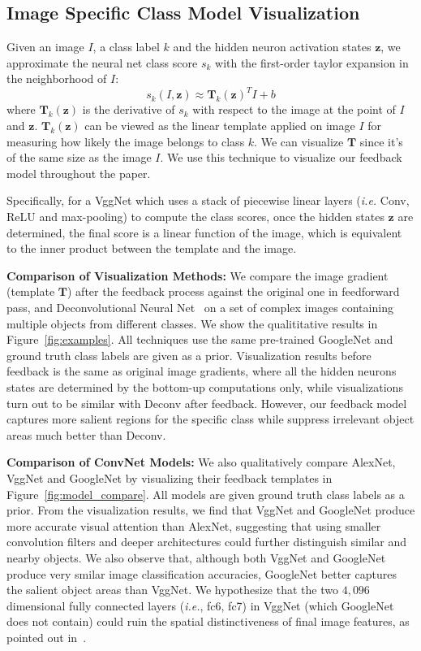 \subsection{Image Specific Class Model Visualization}
\label{subsec:visualization}
Given an image $I$, a class label $k$ and the hidden neuron activation states $\mathbf{z}$, we approximate the neural net class score $s_k$ with the first-order taylor expansion in the neighborhood of $I$:
\begin{equation}
  s_k(I, \mathbf{z}) \approx  \mathbf{T}_k(\mathbf{z})^T I + b
\end{equation}
where $\mathbf{T}_k(\mathbf{z})$ is the derivative of $s_k$ with respect to the image at the point of $I$ and $\mathbf{z}$. $\mathbf{T}_k(\mathbf{z})$ can be viewed as the linear template applied on image $I$ for measuring how likely the image belongs to class $k$. We can visualize $\mathbf{T}$ since it's of the same size as the image $I$. We use this technique to visualize our feedback model throughout the paper.

Specifically, for a VggNet which uses a stack of piecewise linear layers (\emph{i.e.} Conv, ReLU and max-pooling) to compute the class scores, once the hidden states $\mathbf{z}$ are determined, the final score is a linear function of the image, which is equivalent to the inner product between the template and the image.

\textbf{Comparison of Visualization Methods:} We compare the image gradient (template $\mathbf{T}$) after the feedback process against the original one in feedforward pass, and Deconvolutional Neural Net~\cite{zeiler2014visualizing} on a set of complex images containing multiple objects from different classes. We show the qualititative results in Figure~\ref{fig:examples}. All techniques use the same pre-trained GoogleNet and ground truth class labels are given as a prior. Visualization results before feedback is the same as original image gradients, where all the hidden neurons states are determined by the bottom-up computations only, while visualizations turn out to be similar with Deconv after feedback. However, our feedback model captures more salient regions for the specific class while suppress irrelevant object areas much better than Deconv.

\textbf{Comparison of ConvNet Models:} We also qualitatively compare AlexNet, VggNet and GoogleNet by visualizing their feedback templates in Figure~\ref{fig:model_compare}. All models are given ground truth class labels as a prior. From the visualization results, we find that VggNet and GoogleNet produce more accurate visual attention than AlexNet, suggesting that using smaller convolution filters and deeper architectures could further distinguish similar and nearby objects. We also observe that, although both VggNet and GoogleNet produce very smilar image classification accuracies, GoogleNet better captures the salient object areas than VggNet. We hypothesize that the two $4,096$ dimensional fully connected layers (\emph{i.e.}, fc6, fc7) in VggNet (which GoogleNet does not contain) could ruin the spatial distinctiveness of final image features, as pointed out in~\cite{lin2013network}.

